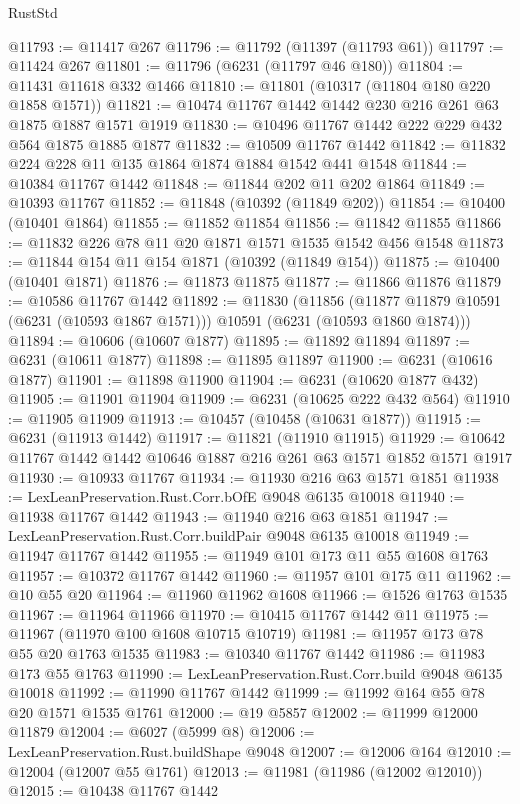 \begin{lexlean}{RustStd}
\begin{coremodule}
{{@11793 := @11417 @267
@11796 := @11792 (@11397 (@11793 @61))
@11797 := @11424 @267
@11801 := @11796 (@6231 (@11797 @46 @180))
@11804 := @11431 @11618 @332 @1466
@11810 := @11801 (@10317 (@11804 @180 @220 @1858 @1571))
@11821 := @10474 @11767 @1442 @1442 @230 @216 @261 @63 @1875 @1887 @1571 @1919
@11830 := @10496 @11767 @1442 @222 @229 @432 @564 @1875 @1885 @1877
@11832 := @10509 @11767 @1442
@11842 := @11832 @224 @228 @11 @135 @1864 @1874 @1884 @1542 @441 @1548
@11844 := @10384 @11767 @1442
@11848 := @11844 @202 @11 @202 @1864
@11849 := @10393 @11767
@11852 := @11848 (@10392 (@11849 @202))
@11854 := @10400 (@10401 @1864)
@11855 := @11852 @11854
@11856 := @11842 @11855
@11866 := @11832 @226 @78 @11 @20 @1871 @1571 @1535 @1542 @456 @1548
@11873 := @11844 @154 @11 @154 @1871 (@10392 (@11849 @154))
@11875 := @10400 (@10401 @1871)
@11876 := @11873 @11875
@11877 := @11866 @11876
@11879 := @10586 @11767 @1442
@11892 := @11830
    (@11856 (@11877 @11879 @10591 (@6231 (@10593 @1867 @1571))) @10591 (@6231 (@10593 @1860 @1874)))
@11894 := @10606 (@10607 @1877)
@11895 := @11892 @11894
@11897 := @6231 (@10611 @1877)
@11898 := @11895 @11897
@11900 := @6231 (@10616 @1877)
@11901 := @11898 @11900
@11904 := @6231 (@10620 @1877 @432)
@11905 := @11901 @11904
@11909 := @6231 (@10625 @222 @432 @564)
@11910 := @11905 @11909
@11913 := @10457 (@10458 (@10631 @1877))
@11915 := @6231 (@11913 @1442)
@11917 := @11821 (@11910 @11915)
@11929 := @10642 @11767 @1442 @1442 @10646 @1887 @216 @261 @63 @1571 @1852 @1571 @1917
@11930 := @10933 @11767
@11934 := @11930 @216 @63 @1571 @1851
@11938 := LexLeanPreservation.Rust.Corr.bOfE @9048 @6135 @10018
@11940 := @11938 @11767 @1442
@11943 := @11940 @216 @63 @1851
@11947 := LexLeanPreservation.Rust.Corr.buildPair @9048 @6135 @10018
@11949 := @11947 @11767 @1442
@11955 := @11949 @101 @173 @11 @55 @1608 @1763
@11957 := @10372 @11767 @1442
@11960 := @11957 @101 @175 @11
@11962 := @10 @55 @20
@11964 := @11960 @11962 @1608
@11966 := @1526 @1763 @1535
@11967 := @11964 @11966
@11970 := @10415 @11767 @1442 @11
@11975 := @11967 (@11970 @100 @1608 @10715 @10719)
@11981 := @11957 @173 @78 @55 @20 @1763 @1535
@11983 := @10340 @11767 @1442
@11986 := @11983 @173 @55 @1763
@11990 := LexLeanPreservation.Rust.Corr.build @9048 @6135 @10018
@11992 := @11990 @11767 @1442
@11999 := @11992 @164 @55 @78 @20 @1571 @1535 @1761
@12000 := @19 @5857
@12002 := @11999 @12000 @11879
@12004 := @6027 (@5999 @8)
@12006 := LexLeanPreservation.Rust.buildShape @9048
@12007 := @12006 @164
@12010 := @12004 (@12007 @55 @1761)
@12013 := @11981 (@11986 (@12002 @12010))
@12015 := @10438 @11767 @1442
}}
\end{coremodule}
\end{lexlean}
